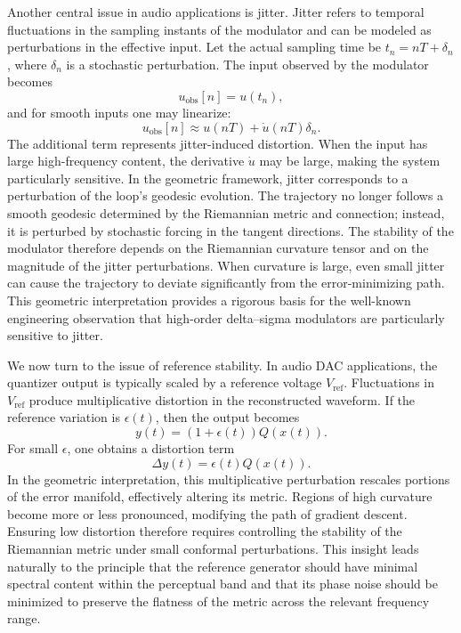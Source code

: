 Another central issue in audio applications is jitter. Jitter refers to temporal fluctuations in the sampling instants of the modulator and can be modeled as perturbations in the effective input. Let the actual sampling time be \(t_n = nT + \delta_n\), where \(\delta_n\) is a stochastic perturbation. The input observed by the modulator becomes
\[
u_{\mathrm{obs}}[n] = u(t_n),
\]
and for smooth inputs one may linearize:
\[
u_{\mathrm{obs}}[n] \approx u(nT) + \dot{u}(nT) \delta_n.
\]
The additional term represents jitter-induced distortion. When the input has large high-frequency content, the derivative \(\dot{u}\) may be large, making the system particularly sensitive. In the geometric framework, jitter corresponds to a perturbation of the loop's geodesic evolution. The trajectory no longer follows a smooth geodesic determined by the Riemannian metric and connection; instead, it is perturbed by stochastic forcing in the tangent directions. The stability of the modulator therefore depends on the Riemannian curvature tensor and on the magnitude of the jitter perturbations. When curvature is large, even small jitter can cause the trajectory to deviate significantly from the error-minimizing path. This geometric interpretation provides a rigorous basis for the well-known engineering observation that high-order delta--sigma modulators are particularly sensitive to jitter.

We now turn to the issue of reference stability. In audio DAC applications, the quantizer output is typically scaled by a reference voltage \(V_{\mathrm{ref}}\). Fluctuations in \(V_{\mathrm{ref}}\) produce multiplicative distortion in the reconstructed waveform. If the reference variation is \(\epsilon(t)\), then the output becomes
\[
y(t) = \left(1 + \epsilon(t)\right) Q(x(t)).
\]
For small \(\epsilon\), one obtains a distortion term
\[
\Delta y(t) = \epsilon(t) Q(x(t)).
\]
In the geometric interpretation, this multiplicative perturbation rescales portions of the error manifold, effectively altering its metric. Regions of high curvature become more or less pronounced, modifying the path of gradient descent. Ensuring low distortion therefore requires controlling the stability of the Riemannian metric under small conformal perturbations. This insight leads naturally to the principle that the reference generator should have minimal spectral content within the perceptual band and that its phase noise should be minimized to preserve the flatness of the metric across the relevant frequency range.


